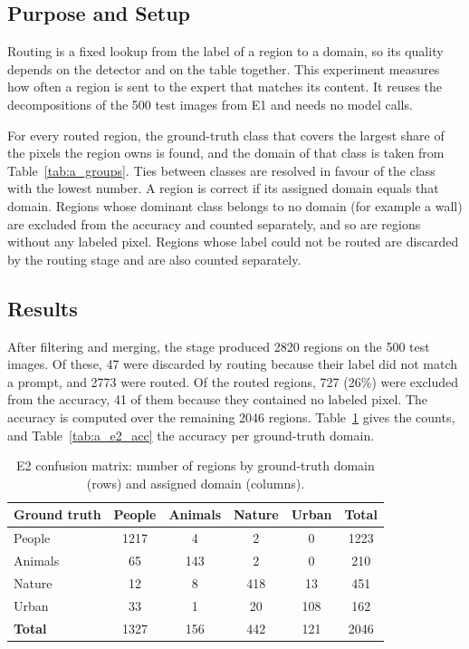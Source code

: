 \documentclass{FastFyp}
\begin{document}
\subsection{Purpose and Setup}
Routing is a fixed lookup from the label of a region to a domain, so its quality depends on the detector and on the table together. This experiment measures how often a region is sent to the expert that matches its content. It reuses the decompositions of the 500 test images from E1 and needs no model calls.
 
For every routed region, the ground-truth class that covers the largest share of the pixels the region owns is found, and the domain of that class is taken from Table~\ref{tab:a_groups}. Ties between classes are resolved in favour of the class with the lowest number. A region is correct if its assigned domain equals that domain. Regions whose dominant class belongs to no domain (for example a wall) are excluded from the accuracy and counted separately, and so are regions without any labeled pixel. Regions whose label could not be routed are discarded by the routing stage and are also counted separately.
 
\subsection{Results}
After filtering and merging, the stage produced 2820 regions on the 500 test images. Of these, 47 were discarded by routing because their label did not match a prompt, and 2773 were routed. Of the routed regions, 727 (26\%) were excluded from the accuracy, 41 of them because they contained no labeled pixel. The accuracy is computed over the remaining 2046 regions. Table~\ref{tab:a_e2_conf} gives the counts, and Table~\ref{tab:a_e2_acc} the accuracy per ground-truth domain.
 
\begin{table}[!ht]
\centering
\caption{E2 confusion matrix: number of regions by ground-truth domain (rows) and assigned domain (columns).}
\label{tab:a_e2_conf}
\begin{tabular}{|l|c|c|c|c|c|}
\hline
\textbf{Ground truth} & \textbf{People} & \textbf{Animals} & \textbf{Nature} & \textbf{Urban} & \textbf{Total} \\ \hline
People & 1217 & 4 & 2 & 0 & 1223 \\ \hline
Animals & 65 & 143 & 2 & 0 & 210 \\ \hline
Nature & 12 & 8 & 418 & 13 & 451 \\ \hline
Urban & 33 & 1 & 20 & 108 & 162 \\ \hline
\textbf{Total} & 1327 & 156 & 442 & 121 & 2046 \\ \hline
\end{tabular}
\end{table}
 
\end{document}
